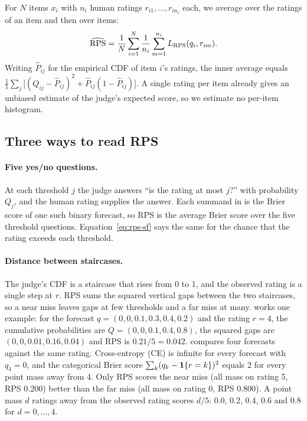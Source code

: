 For $N$ items $x_i$ with $n_i$ human ratings $r_{i1},\dots,r_{in_i}$ each, we average over the ratings of an item and then over items:
\begin{equation}
\widehat{\mathrm{RPS}}=\frac1N\sum_{i=1}^{N}\frac1{n_i}\sum_{m=1}^{n_i}L_{\mathrm{RPS}}(q_i,r_{im}).
\end{equation}
Writing $\hat P_{ij}$ for the empirical CDF of item $i$'s ratings, the inner average equals $\frac15\sum_j\bigl[(Q_{ij}-\hat P_{ij})^2+\hat P_{ij}(1-\hat P_{ij})\bigr]$.
A single rating per item already gives an unbiased estimate of the judge's expected score, so we estimate no per-item histogram.

\subsection{Three ways to read RPS}
\label{app:rps-read}

\paragraph{Five yes/no questions.}
At each threshold $j$ the judge answers ``is the rating at most $j$?'' with probability $Q_j$, and the human rating supplies the answer.
Each summand in  is the Brier score of one such binary forecast, so RPS is the average Brier score over the five threshold questions.
Equation~\ref{eq:rps-sf} says the same for the chance that the rating exceeds each threshold.

\paragraph{Distance between staircases.}
The judge's CDF is a staircase that rises from 0 to 1, and the observed rating is a single step at $r$.
RPS sums the squared vertical gaps between the two staircases, so a near miss leaves gaps at few thresholds and a far miss at many.
 works one example: for the forecast $q=(0,0,0.1,0.3,0.4,0.2)$ and the rating $r=4$, the cumulative probabilities are $Q=(0,0,0.1,0.4,0.8)$, the squared gaps are $(0,0,0.01,0.16,0.04)$ and RPS is $0.21/5=0.042$.
 compares four forecasts against the same rating.
Cross-entropy (CE) is infinite for every forecast with $q_4=0$, and the categorical Brier score $\sum_k(q_k-\mathbf{1}\{r=k\})^2$ equals 2 for every point mass away from 4.
Only RPS scores the near miss (all mass on rating 5, RPS 0.200) better than the far miss (all mass on rating 0, RPS 0.800).
A point mass $d$ ratings away from the observed rating scores $d/5$: 0.0, 0.2, 0.4, 0.6 and 0.8 for $d=0,\dots,4$.

